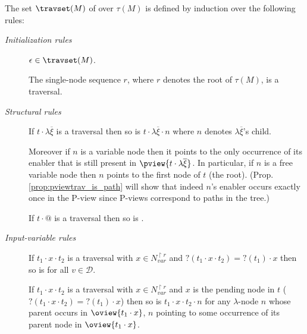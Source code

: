 \begin{definition} \rm
\label{def:traversal} The set $\travset(M)$ of 
over $\tau(M)$ is defined by induction over the following rules:

\noindent \emph{Initialization rules}
\begin{description}
\item[] $\epsilon \in \travset(M)$.
\item[] The single-node sequence $r$, where $r$ denotes the root of $\tau(M)$, is a traversal.
\end{description}

\noindent \emph{Structural rules}
\begin{description}
\item[] If $t \cdot \lambda \overline{\xi}$ is a traversal then so is
$t \cdot \lambda \overline{\xi} \cdot n$ where $n$ denotes $\lambda
\overline{\xi}$'s child.

Moreover if $n$ is a variable node then it
points to the only
occurrence of its enabler that is still present in $\pview{t
\cdot \lambda \overline{\xi}}$.
In particular, if $n$ is a free variable node then $n$ points to the first node of $t$ (the root). (Prop. \ref{prop:pviewtrav_is_path} will show that indeed $n$'s enabler occurs exactly once in the P-view since P-views correspond to paths in the tree.)

\item[] If $t \cdot @$ is a traversal then so is .
\end{description}

\noindent \emph{Input-variable rules}
\begin{description}
\item[] If $t_1 \cdot x \cdot t_2$ is a traversal
with $x \in N_{var}^{\upharpoonright r}$ and $?(t_1 \cdot x
\cdot t_2)=?(t_1) \cdot x$ then so is  for all $v \in
\mathcal{D}$.

\item[] If $t_1 \cdot x \cdot t_2$ is a traversal with
  $x \in N_{var}^{\upharpoonright r}$ and $x$ is the pending node in $t$ ($?(t_1 \cdot x \cdot
  t_2)=?(t_1) \cdot x$) then so is $t_1 \cdot x \cdot t_2 \cdot
  n$ for any $\lambda$-node $n$ whose parent occurs in
  $\oview{t_1 \cdot x}$, $n$ pointing to some occurrence of its
  parent node in $\oview{t_1 \cdot x}$.
\end{description}


\end{definition}
